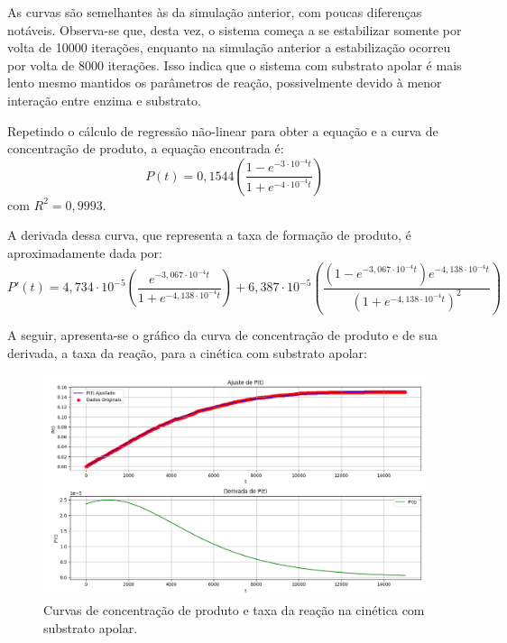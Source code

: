 \documentclass[12pt,oneside]{report}
\begin{document}
As curvas são semelhantes às da simulação anterior, com poucas diferenças notáveis. Observa-se que, desta vez, o sistema começa a se estabilizar somente por volta de 10000 iterações, enquanto na simulação anterior a estabilização ocorreu por volta de 8000 iterações. Isso indica que o sistema com substrato apolar é mais lento mesmo mantidos os parâmetros de reação, possivelmente devido à menor interação entre enzima e substrato.

Repetindo o cálculo de regressão não-linear para obter a equação e a curva de concentração de produto, a equação encontrada é:
\begin{equation}
    P(t) = 0{,}1544 \left(\frac{1 - e^{-3 \cdot 10^{-4} t}}{1 + e^{-4 \cdot 10^{-4} t}}\right)
    \label{eq:produto_MM_apolar}
\end{equation}
com $R^2 = 0{,}9993$.

A derivada dessa curva, que representa a taxa de formação de produto, é aproximadamente dada por:
\begin{equation}
    P'(t) = 4{,}734 \cdot 10^{-5} \left(\frac{e^{-3{,}067 \cdot 10^{-4} t}}{1 + e^{-4{,}138 \cdot 10^{-4} t}}\right) + 6{,}387 \cdot 10^{-5} \left(\frac{(1 - e^{-3{,}067 \cdot 10^{-4} t}) e^{-4{,}138 \cdot 10^{-4} t}}{(1 + e^{-4{,}138 \cdot 10^{-4} t})^2}\right)
    \label{eq:taxa_MM_apolar}
\end{equation}

A seguir, apresenta-se o gráfico da curva de concentração de produto e de sua derivada, a taxa da reação, para a cinética com substrato apolar:

\begin{figure}[H]
    \centering
    \includegraphics[width=1\textwidth]{MM_apolar_rate.png}
    \caption{\small Curvas de concentração de produto e taxa da reação na cinética com substrato apolar.}
    \label{fig:MM_apolar_rate}
\end{figure}
\end{document}
